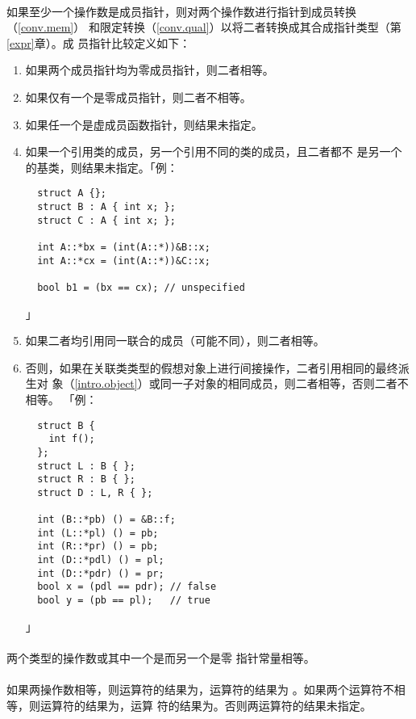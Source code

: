 \paragraph{}
如果至少一个操作数是成员指针，则对两个操作数进行指针到成员转换（\ref{conv.mem}）
和限定转换（\ref{conv.qual}）以将二者转换成其合成指针类型（第\ref{expr}章）。成
员指针比较定义如下：
\begin{enumerate}
  \item{如果两个成员指针均为零成员指针，则二者相等。}
  \item{如果仅有一个是零成员指针，则二者不相等。}
  \item{如果任一个是虚成员函数指针，则结果未指定。}
  \item{如果一个引用类的成员，另一个引用不同的类的成员，且二者都不
    是另一个的基类，则结果未指定。「例：
\begin{lstlisting}
  struct A {};
  struct B : A { int x; };
  struct C : A { int x; };

  int A::*bx = (int(A::*))&B::x;
  int A::*cx = (int(A::*))&C::x;

  bool b1 = (bx == cx); // unspecified
\end{lstlisting}」}
  \item{如果二者均引用同一联合的成员（可能不同），则二者相等。}
  \item{否则，如果在关联类类型的假想对象上进行间接操作，二者引用相同的最终派生对
    象（\ref{intro.object}）或同一子对象的相同成员，则二者相等，否则二者不相等。
    「例：
\begin{lstlisting}
  struct B {
    int f();
  };
  struct L : B { };
  struct R : B { };
  struct D : L, R { };

  int (B::*pb) () = &B::f;
  int (L::*pl) () = pb;
  int (R::*pr) () = pb;
  int (D::*pdl) () = pl;
  int (D::*pdr) () = pr;
  bool x = (pdl == pdr); // false
  bool y = (pb == pl);   // true
\end{lstlisting}」}
\end{enumerate}

\paragraph{}
两个类型的操作数或其中一个是而另一个是零
指针常量相等。

\paragraph{}
如果两操作数相等，则\tm{==}运算符的结果为，\tm{!=}运算符的结果为
。如果两个运算符不相等，则\tm{==}运算符的结果为，\tm{!=}运算
符的结果为。否则两运算符的结果未指定。

